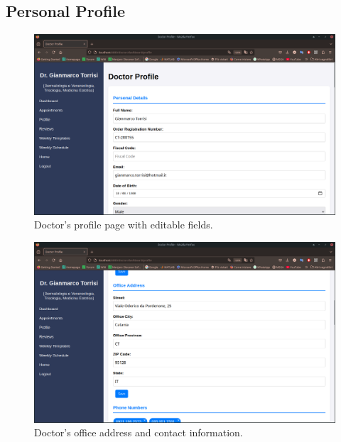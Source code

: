 \subsection{Personal Profile}

\begin{figure}[!h]
	\centering
	\includegraphics[scale=0.30]{resources/screenshots/doctor_ui/personal_info.png}
	\caption{Doctor's profile page with editable fields.}
	\label{fig:doctor_profile}
\end{figure}

\begin{figure}[!h]
	\centering
	\includegraphics[scale=0.30]{resources/screenshots/doctor_ui/address.png}
	\caption{Doctor's office address and contact information.}
	\label{fig:doctor_address}
\end{figure}

